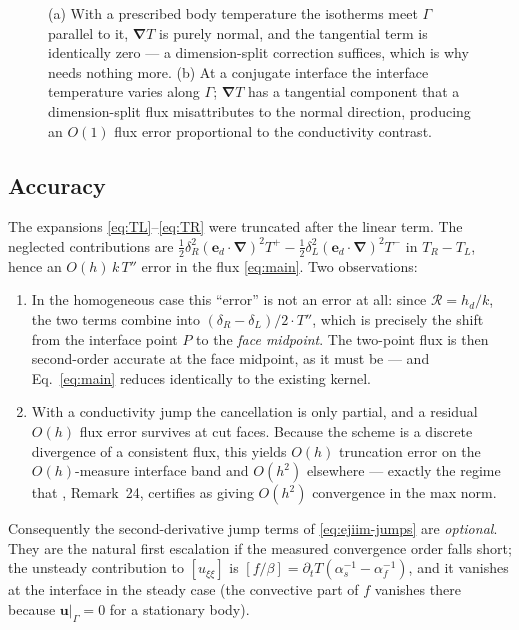 \documentclass[11pt,a4paper]{article}
\newcommand{\jump}[1]{\left[#1\right]}
\newcommand{\ed}{\boldsymbol{e}_d}
\newcommand{\grad}{\boldsymbol{\nabla}}
\newcommand{\Rser}{\mathcal{R}}
\begin{document}
\begin{figure}[htbp]
\caption{(a) With a prescribed body temperature the isotherms meet $\Gamma$
parallel to it, $\grad T$ is purely normal, and the tangential term is
identically zero --- a dimension-split correction suffices, which is why
\cite{luchini2025} needs nothing more. (b) At a conjugate interface the
interface temperature varies along $\Gamma$; $\grad T$ has a tangential
component that a dimension-split flux misattributes to the normal direction,
producing an $O(1)$ flux error proportional to the conductivity contrast.}
\label{fig:tangential}
\end{figure}

\subsection{Accuracy}
\label{sec:accuracy}

The expansions \eqref{eq:TL}--\eqref{eq:TR} were truncated after the linear
term. The neglected contributions are
$\tfrac12\delta_R^{2}(\ed\!\cdot\!\grad)^2T^{+}
 -\tfrac12\delta_L^{2}(\ed\!\cdot\!\grad)^2T^{-}$
in $T_R-T_L$, hence an $O(h)\,k\,T''$ error in the flux \eqref{eq:main}. Two
observations:
\begin{enumerate}
\item In the homogeneous case this ``error'' is not an error at all: since
      $\Rser=h_d/k$, the two terms combine into
      $(\delta_R-\delta_L)/2 \cdot T''$, which is precisely the shift from the
      interface point $P$ to the \emph{face midpoint}. The two-point flux is then
      second-order accurate at the face midpoint, as it must be --- and
      Eq.~\eqref{eq:main} reduces identically to the existing kernel.
\item With a conductivity jump the cancellation is only partial, and a residual
      $O(h)$ flux error survives at cut faces. Because the scheme is a discrete
      divergence of a consistent flux, this yields $O(h)$ truncation error on the
      $O(h)$-measure interface band and $O(h^2)$ elsewhere --- exactly the
      regime that \cite{ejiim2000}, Remark~24, certifies as giving $O(h^2)$
      convergence in the max norm.
\end{enumerate}
Consequently the second-derivative jump terms of \eqref{eq:ejiim-jumps} are
\emph{optional}. They are the natural first escalation if the measured
convergence order falls short; the unsteady contribution to $\jump{u_{\xi\xi}}$
is $\jump{f/\beta}=\partial_tT\left(\alpha_s^{-1}-\alpha_f^{-1}\right)$, and it
vanishes at the interface in the steady case (the convective part of $f$
vanishes there because $\boldsymbol{u}|_\Gamma=0$ for a stationary body).
\end{document}
